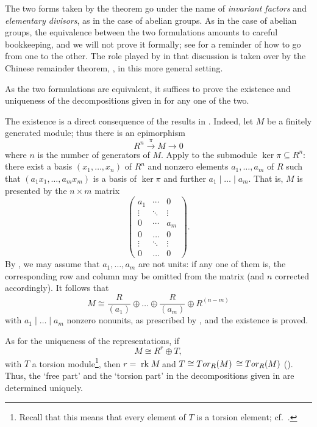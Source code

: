 The two forms taken by the theorem go under the name of
\emph{invariant factors} and \emph{elementary divisors}, as in the
case of abelian groups. As in the case of abelian groups, the
equivalence between the two formulations amounts to careful
bookkeeping, and we will not prove it formally; see
 for
a reminder of how to go from one to the other. The role played by
 in that discussion is taken over by the Chinese
remainder theorem, , in this more general setting.

As the two formulations are equivalent, it suffices to prove the
existence and uniqueness of the decompositions given in
 for any one of the two.

The existence is a direct consequence of the results in
.  Indeed, let $M$
be a finitely generated module; thus there is an epimorphism
\[
  R^n \xrightarrow{\pi} M \to 0
\]
where $n$ is the number of generators of $M$. Apply 
to the submodule $\ker\pi \subseteq R^n$: there exist a basis
$(x_1, \dots, x_n)$ of $R^n$ and nonzero elements $a_1, \dots, a_m$ of
$R$ such that $(a_1 x_1, \dots, a_m x_m)$ is a basis of $\ker\pi$ and
further $a_1 \mid \dots \mid a_m$. That is, $M$ is presented by the
$n \times m$ matrix
\[
  \begin{pmatrix}
    a_1 & \cdots & 0 \\
    \vdots & \ddots & \vdots \\
    0 & \cdots & a_m \\
    0 & \dots & 0 \\
    \vdots & \ddots & \vdots \\
    0 & \dots & 0
  \end{pmatrix}.
\]
By , we may assume that $a_1, \dots, a_m$ are not
units: if any one of them is, the corresponding row and column may be
omitted from the matrix (and $n$ corrected accordingly). It follows
that
\[
  M \cong \frac{R}{(a_1)} \oplus \dots \oplus \frac{R}{(a_m)} \oplus
  R^{(n-m)}
\]
with $a_1 \mid \dots \mid a_m$ nonzero nonunits, as prescribed by
, and the existence is proved.

As for the uniqueness of the representations, if
\[
  M \cong R^r \oplus T,
\]
with $T$ a torsion module\footnote{Recall that this means that every
  element of $T$ is a torsion element; cf.\
  .}, then $r = \operatorname{rk} M$
and $T \cong Tor_R(M)$ $\cong Tor_R(M)$
(). Thus,
the `free part' and the `torsion part' in the decompositions given in
\Cref{thm:linalg:structure-theorem-fg-modules-over-pid} are determined uniquely.

